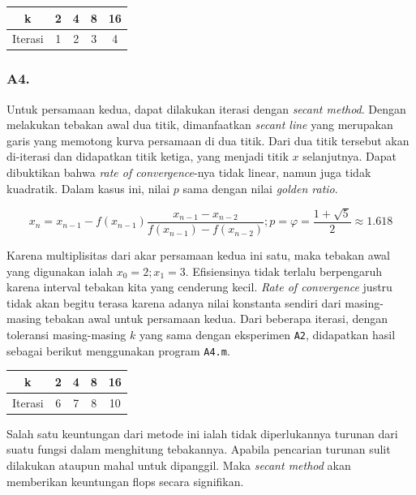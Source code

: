 \documentclass[11pt, a4paper, onecolumn, oneside, final]{report}
\begin{document}
\begin{table}[H]
\centering
\begin{tabular}{|c|c|c|c|c|}
\hline
k       & 2 & 4 & 8 & 16 \\ \hline
Iterasi & 1 & 2 & 3 & 4 \\ \hline
\end{tabular}
\end{table}
 
\subsubsection*{A4.}

Untuk persamaan kedua, dapat dilakukan iterasi dengan \textit{secant method}. Dengan melakukan tebakan awal dua titik, dimanfaatkan \textit{secant line} yang merupakan garis yang memotong kurva persamaan di dua titik. Dari dua titik tersebut akan di-iterasi dan didapatkan titik ketiga, yang menjadi titik $x$ selanjutnya. Dapat dibuktikan bahwa \textit{rate of convergence}-nya tidak linear, namun juga tidak kuadratik. Dalam kasus ini, nilai $p$ sama dengan nilai \textit{golden ratio}.

$$
x_{n}=x_{n-1}-f(x_{n-1}){\frac {x_{n-1}-x_{n-2}}{f(x_{n-1})-f(x_{n-2})}}; p = \varphi ={\frac {1+{\sqrt {5}}}{2}}\approx 1.618
$$

Karena multiplisitas dari akar persamaan kedua ini satu, maka tebakan awal yang digunakan ialah $x_0 = 2; x_1 = 3$. Efisiensinya tidak terlalu berpengaruh karena interval tebakan kita yang cenderung kecil. \textit{Rate of convergence} justru tidak akan begitu terasa karena adanya nilai konstanta sendiri dari masing-masing tebakan awal untuk persamaan kedua. Dari beberapa iterasi, dengan toleransi masing-masing $k$ yang sama dengan eksperimen \texttt{A2}, didapatkan hasil sebagai berikut menggunakan program \texttt{A4.m}.

\begin{table}[H]
\centering
\begin{tabular}{|c|c|c|c|c|}
\hline
k       & 2 & 4 & 8 & 16 \\ \hline
Iterasi & 6 & 7 & 8 & 10 \\ \hline
\end{tabular}
\end{table}

Salah satu keuntungan dari metode ini ialah tidak diperlukannya turunan dari suatu fungsi dalam menghitung tebakannya. Apabila pencarian turunan sulit dilakukan ataupun mahal untuk dipanggil. Maka \textit{secant method} akan memberikan keuntungan flops secara signifikan.
\end{document}
